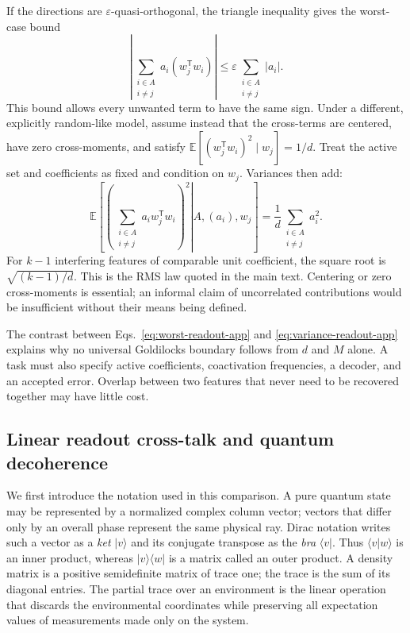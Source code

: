 \documentclass[
  aps,
  reprint,
  superscriptaddress,
  floatfix,
  nofootinbib,
  longbibliography
]{revtex4-2}
\newcommand{\E}{\mathbb{E}}
\newcommand{\T}{^{\mathsf T}}
\begin{document}
If the directions are $\varepsilon$-quasi-orthogonal, the triangle inequality
gives the worst-case bound
\begin{equation}
 \left|
 \sum_{\substack{i\in A\\i\ne j}}a_i(w_j\T w_i)
 \right|
 \leq\varepsilon\sum_{\substack{i\in A\\i\ne j}}|a_i|.
 \label{eq:worst-readout-app}
\end{equation}
This bound allows every unwanted term to have the same sign.  Under a
different, explicitly random-like model, assume instead that the cross-terms
are centered, have zero cross-moments, and satisfy
$\E[(w_j\T w_i)^2\mid w_j]=1/d$.  Treat the active set and coefficients as fixed
and condition on $w_j$.  Variances then add:
\begin{equation}
 \E\!\left[
 \left.
 \left(\sum_{\substack{i\in A\\i\ne j}}a_iw_j\T w_i\right)^2
 \right|A,(a_i),w_j
 \right]
 =\frac1d\sum_{\substack{i\in A\\i\ne j}}a_i^2.
 \label{eq:variance-readout-app}
\end{equation}
For $k-1$ interfering features of comparable unit coefficient, the square root
is $\sqrt{(k-1)/d}$.  This is the RMS law quoted in the main text.  Centering
or zero cross-moments is essential; an informal claim of uncorrelated
contributions would be insufficient without their means being defined.

The contrast between Eqs.~\eqref{eq:worst-readout-app} and
\eqref{eq:variance-readout-app} explains why no universal Goldilocks boundary
follows from $d$ and $M$ alone.  A task must also specify active coefficients,
coactivation frequencies, a decoder, and an accepted error.  Overlap between
two features that never need to be recovered together may have little cost.

\subsection{Linear readout cross-talk and quantum decoherence}
\label{app:dirac}

We first introduce the notation used in this comparison.  A pure quantum
state may be represented by a normalized complex column vector; vectors that
differ only by an overall phase represent the same physical ray.  Dirac
notation writes such a vector as a
\emph{ket} $|v\rangle$ and its conjugate transpose as the \emph{bra}
$\langle v|$.  Thus $\langle v|w\rangle$ is an inner product, whereas
$|v\rangle\langle w|$ is a matrix called an outer product.  A density matrix
is a positive semidefinite matrix of trace one; the trace is the sum of its
diagonal entries.  The partial trace over an environment is the linear
operation that discards the environmental coordinates while preserving all
expectation values of measurements made only on the system.
\end{document}
